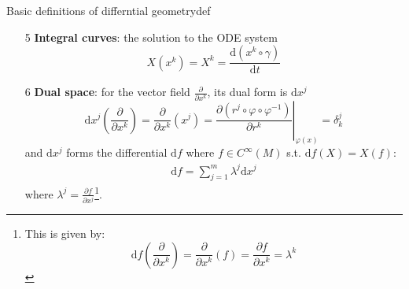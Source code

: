 \begin{definition}{Basic definitions of differntial geometry}{def}
\begin{enumerate}
        $$
        X = \sum^m_{k=1}X^k\frac{\partial}{\partial x^k},\ \forall X\in\mathrm{T}_x(M)
        $$
        where $X^k = X(x^k)$\footnote{This is given by:
        \begin{align*}
            \frac{\partial}{\partial x^k}(x^j) = \left.\frac{\partial (x^j \circ \varphi^{-1})}{\partial r^k}\right\vert_{\varphi(x)} = \left.\frac{\partial (r^j\circ \varphi \circ \varphi^{-1})}{\partial r^k}\right\vert_{\varphi(x)} = \left.\frac{\partial r^j}{\partial r^k}\right\vert_{\varphi(x)} = \delta ^j_k \Rightarrow X(x^j)=\sum^m_{k=1}X^k\delta^j_k=X^j
        \end{align*}}.
        \item[5] \textbf{Integral curves}: the solution to the ODE system
        $$
        X(x^k) = X^k  = \frac{\mathrm{d}(x^k\circ\gamma)}{\mathrm{d}t}
        $$
        \item[6] \textbf{Dual space}: for the vector field $\frac{\partial}{\partial x^k}$, its dual form is $\mathrm{d}x^j$
        $$
        \mathrm{d}x^j\left(\frac{\partial}{\partial x^k}\right) = \frac{\partial}{\partial x^k}(x^j) = \left.\frac{\partial (r^j \circ \varphi \circ \varphi^{-1})}{\partial r^k}\right\vert_{\varphi(x)} = \delta^j_k
        $$
        and $\mathrm{d}x^j$ forms the differential $\mathrm{d}f$ where $f\in C^{\infty}(M)$ s.t. $\mathrm{d}f(X)=X(f)$:
        \begin{align*}
            \mathrm{d}f = \sum^m_{j=1}\lambda^j\mathrm{d}x^j
        \end{align*}
        where $\lambda^j = \frac{\partial f}{\partial x^j}$\footnote{This is given by: 
        $$
        \mathrm{d}f\left(\frac{\partial}{\partial x^k}\right) = \frac{\partial}{\partial x^k}(f) = \frac{\partial f}{\partial x^k} = \lambda^k
        $$
        }.
    \end{enumerate}
\end{definition}

